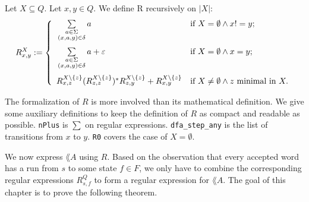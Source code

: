 \begin{definition}
    \label{R}
    Let $X \subseteq Q$. Let $x, y \in Q$.
    We define R recursively on $|X|$:
    \begin{equation*}
        R^X_{x,y} := \left\{  
                \begin{array}{ll}
                    \vphantom{ \sum\limits_{ \substack{ a \in \Sigma\\ (x,a,y) \in \delta \\ b \in \Sigma } } }
                    \sum\limits_{
                        \substack{
                            a \in \Sigma\\
                            (x,a,y) \in \delta
                        }
                    } a 
                    & \mbox{if } X = \emptyset \wedge x != y; \\
                    \vphantom{ \sum\limits_{ \substack{ a \in \Sigma\\ (x,a,y) \in \delta \\ b \in \Sigma } } }
                    \sum\limits_{
                        \substack{
                            a \in \Sigma\\
                            (x,a,y) \in \delta
                        }
                    } a + \varepsilon 
                    & \mbox{if } X = \emptyset \wedge x = y; \\
                     R^{X\backslash\{z\}}_{x,z} (R^{X\backslash\{z\}}_{z,z})^* R^{X\backslash\{z\}}_{z,y} + R^{X\backslash\{z\}}_{x,y}
                     & \mbox{if } X \neq \emptyset \wedge z \mbox{ minimal in } X.
                \end{array}
            \right.
    \end{equation*}
\end{definition}

The formalization of $R$ is more involved than its mathematical definition. 
We give some auxiliary definitions to keep the definition of $R$ as compact and readable as possible.
\lstinline{nPlus} is $\sum$ on regular expressions.
\lstinline{dfa_step_any} is the list of transitions from $x$ to $y$.
\lstinline{R0} covers the case of $X=\emptyset$.



We now express $\lang{A}$ using $R$.
Based on the observation that every accepted word has a run from $s$ to some state $f \in F$, 
we only have to combine the corresponding regular expressions $R^Q_{s,f}$ to form a regular expression for $\lang{A}$.
The goal of this chapter is to prove the following theorem. 

